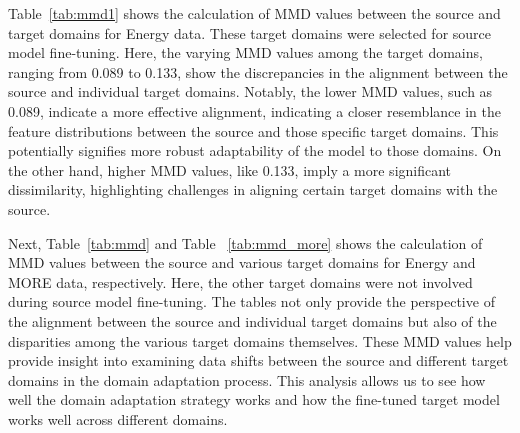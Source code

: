 \documentclass[letterpaper]{article} %
\begin{document}
Table~\ref{tab:mmd1} shows the calculation of MMD values between the source and target domains for Energy data. These target domains were selected for source model fine-tuning. Here, the varying MMD values among the target domains, ranging from 0.089 to 0.133, show the discrepancies in the alignment between the source and individual target domains. Notably, the lower MMD values, such as 0.089, indicate a more effective alignment, indicating a closer resemblance in the feature distributions between the source and those specific target domains. This potentially signifies more robust adaptability of the model to those domains. On the other hand, higher MMD values, like 0.133, imply a more significant dissimilarity, highlighting challenges in aligning certain target domains with the source.

Next, Table~\ref{tab:mmd} and Table ~\ref{tab:mmd_more} shows the calculation of MMD values between the source and various target domains for Energy and MORE data, respectively. Here, the other target domains were not involved during source model fine-tuning. The tables not only provide the perspective of the alignment between the source and individual target domains but also of the disparities among the various target domains themselves. These MMD values help provide insight into examining data shifts between the source and different target domains in the domain adaptation process. This analysis allows us to see how well the domain adaptation strategy works and how the fine-tuned target model works well across different domains.
\end{document}

